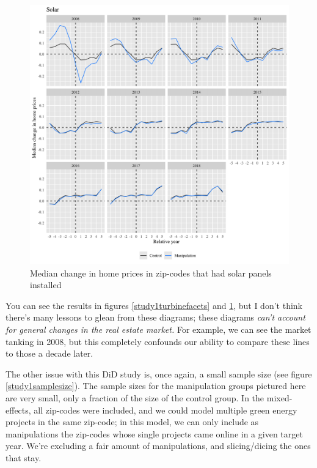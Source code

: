\documentclass{article}
\begin{document}
\begin{figure}[h]
\centering
\includegraphics[width=0.9\linewidth]
{study1_solar_facets.png} 
\caption{Median change in home prices in zip-codes that had solar panels installed}
\label{study1solarfacets}
\end{figure}

You can see the results in figures \ref{study1turbinefacets} and \ref{study1solarfacets}, but I don't think there's many lessons to glean from these diagrams; these diagrams \emph{can't account for general changes in the real estate market.}
For example, we can see the market tanking in 2008, but this completely confounds our ability to compare these lines to those a decade later.

The other issue with this DiD study is, once again, a small sample size (see figure \ref{study1samplesize}). 
The sample sizes for the manipulation groups pictured here are very small, only a fraction of the size of the control group.
In the mixed-effects, all zip-codes were included, and we could model multiple green energy projects in the same zip-code; in this model, we can only include as manipulations the zip-codes whose single projects came online in a given target year.
We're excluding a fair amount of manipulations, and slicing/dicing the ones that stay.
\end{document}
